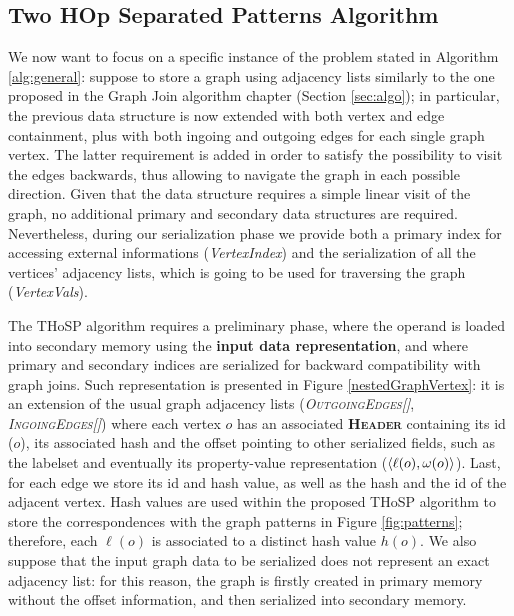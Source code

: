 
\subsection{Two HOp Separated Patterns Algorithm}\label{sec:THOSPA}
We now want to focus on a specific instance of the problem stated in Algorithm \ref{alg:general}: suppose to store a graph using adjacency lists similarly to the one proposed in the Graph Join algorithm chapter (Section \vref{sec:algo}); in particular, the previous data structure is now extended with both vertex and edge containment, plus with both ingoing and outgoing edges for each single graph vertex. The latter requirement is added in order to satisfy the possibility to visit the edges backwards, thus allowing to navigate the graph in each possible direction. 
Given that the data structure requires a simple linear visit of the graph, no additional primary and secondary data structures are required. Nevertheless, during our serialization phase we provide both a primary index for accessing external informations (\textit{VertexIndex}) and the serialization of all the vertices' adjacency lists, which is going to be used for traversing the graph (\textit{VertexVals}). 

The THoSP algorithm requires a preliminary phase, where the operand is loaded into secondary memory using the \textbf{input data  representation}, and where primary and secondary indices are serialized for backward compatibility with graph joins. Such representation is presented in Figure \ref{nestedGraphVertex}: it is an extension of the usual graph adjacency lists (\textit{\textsc{OutgoingEdges[]}}, \textit{\textsc{IngoingEdges[]}}) where each vertex $o$ has an associated \textbf{\textsc{Header}} containing its id ($o$), its associated hash and the offset pointing to other serialized fields, such as the labelset and eventually its property-value representation ($\Braket{\ell(o),\omega(o)}$). Last, for each edge we store its id and hash value, as well as the hash and the id of the adjacent vertex. Hash values are used within the proposed THoSP algorithm to store the correspondences with the graph patterns in Figure \ref{fig:patterns}; therefore, each $\ell(o)$ is associated to a distinct hash value  $h(o)$. We also suppose that the input graph data to be serialized does not represent an exact adjacency list: for this reason, the graph is firstly created in primary memory without the offset information, and then serialized into secondary memory. 

